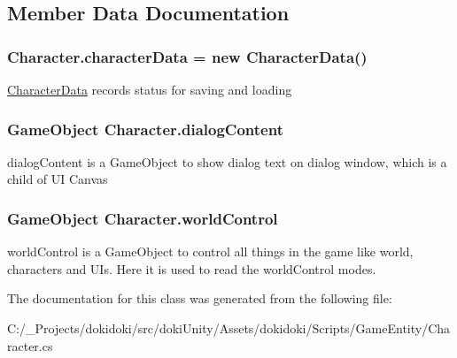 \subsection{Member Data Documentation}
\subsubsection[{\texorpdfstring{character\+Data}{characterData}}]{ Character.\+character\+Data = new {\bf Character\+Data}()}\hypertarget{class_character_af86674f9440ec86b61c057dbc1b8586e}{}\label{class_character_af86674f9440ec86b61c057dbc1b8586e}


\hyperlink{class_character_data}{Character\+Data} records status for saving and loading 

\subsubsection[{\texorpdfstring{dialog\+Content}{dialogContent}}]{\setlength{\rightskip}{0pt plus 5cm}Game\+Object Character.\+dialog\+Content}\hypertarget{class_character_a9eb4f04ae4acf1fa7666b93d1f5c5da6}{}\label{class_character_a9eb4f04ae4acf1fa7666b93d1f5c5da6}


dialog\+Content is a Game\+Object to show dialog text on dialog window, which is a child of UI Canvas 

\subsubsection[{\texorpdfstring{world\+Control}{worldControl}}]{\setlength{\rightskip}{0pt plus 5cm}Game\+Object Character.\+world\+Control}\hypertarget{class_character_acb8eae0fe1b057a002e83b9fe6c5e02c}{}\label{class_character_acb8eae0fe1b057a002e83b9fe6c5e02c}


world\+Control is a Game\+Object to control all things in the game like world, characters and U\+Is. Here it is used to read the world\+Control modes. 



The documentation for this class was generated from the following file\+:\begin{DoxyCompactItemize}
\item 
C\+:/\+\_\+\+Projects/dokidoki/src/doki\+Unity/\+Assets/dokidoki/\+Scripts/\+Game\+Entity/Character.\+cs\end{DoxyCompactItemize}
